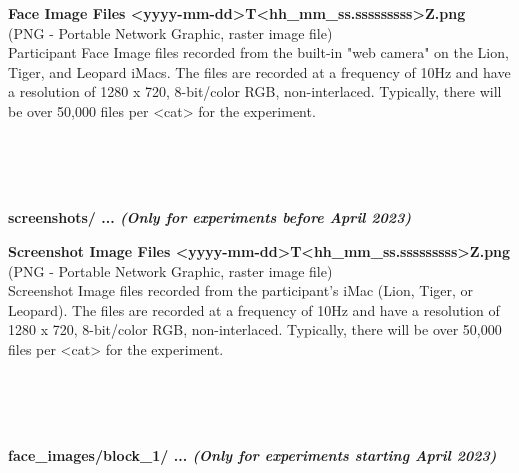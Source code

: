 \begin{description}
\begin{addmargin}[0em]{0em}
    \begin{addmargin}[1em]{0em} %
        \textbf{Face Image Files <yyyy-mm-dd>T<hh\_mm\_ss.sssssssss>Z.png}\\
        (PNG - Portable Network Graphic, raster image file)\\
        Participant Face Image files recorded from the built-in "web camera" on the Lion, Tiger, and Leopard iMacs.
        The files are recorded at a frequency of 10Hz and have a resolution of 1280 x 720, 8-bit/color RGB, non-interlaced.
        Typically, there will be over 50,000 files per <cat> for the experiment. 
    \end{addmargin} %

\end{addmargin} %


\textbf{\\\\\\}
\begin{addmargin}[0em]{0em} %
    \textbf{screenshots/ ... \textit{(Only for experiments before April 2023)}}

    \begin{addmargin}[1em]{0em} %
        \textbf{Screenshot Image Files <yyyy-mm-dd>T<hh\_mm\_ss.sssssssss>Z.png}\\
        (PNG - Portable Network Graphic, raster image file)\\
        Screenshot Image files recorded from the participant's iMac (Lion, Tiger, or Leopard).
        The files are recorded at a frequency of 10Hz and have a resolution of 1280 x 720, 8-bit/color RGB, non-interlaced.
        Typically, there will be over 50,000 files per <cat> for the experiment. 
    \end{addmargin} %

\end{addmargin} %


\textbf{\\\\\\}
\begin{addmargin}[0em]{0em} %
    \textbf{face\_images/block\_1/ ... \textit{(Only for experiments starting April 2023)}}


\end{addmargin}
\end{description}
